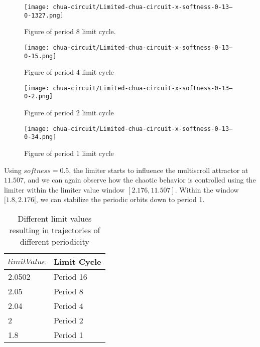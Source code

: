 \documentclass[main]{subfiles}
\begin{document}
\begin{figure}[H]
\centering
\texttt{[image: chua-circuit/Limited-chua-circuit-x-softness-0-13--0-1327.png]}
\caption[Figure of period 8 limit cycle]{Figure of period 8 limit cycle.}
\label{figure:x-0.13-8-limit-cycle-upperscroll-trajectory}
\end{figure}

\begin{figure}[H]
\centering
\texttt{[image: chua-circuit/Limited-chua-circuit-x-softness-0-13--0-15.png]}
\caption[Figure of period 4 limit cycle]{Figure of period 4 limit cycle}
\label{figure:x-0.13-4-limit-cycle-upperscroll-trajectory}
\end{figure}

\begin{figure}[H]
\centering
\texttt{[image: chua-circuit/Limited-chua-circuit-x-softness-0-13--0-2.png]}
\caption[Figure of period 3 limit cycle]{Figure of period 2 limit cycle}
\label{figure:x-0.13-2-limit-cycle-upperscroll-trajectory}
\end{figure}

\begin{figure}[H]
\centering
\texttt{[image: chua-circuit/Limited-chua-circuit-x-softness-0-13--0-34.png]}
\caption[Figure of period 1 limit cycle]{Figure of period 1 limit cycle}
\label{figure:x-0.13-1-limit-cycle-upperscroll-trajectory}
\end{figure}

Using \(softness=0.5\), the limiter starts to influence the multiscroll attractor at \(11.507\), and we can again observe how the chaotic behavior is controlled using the limiter within the limiter value window \([2.176,11.507]\). %
%
Within the window \([1.8,2.176[\), we can stabilize the periodic orbits down to period 1.

\begin{table}[H]
\renewcommand{\arraystretch}{1.2}
\center
\begin{tabular}{@{}ll@{}}
	\toprule
   \(limitValue\) & Limit Cycle\\
   \midrule
   2.0502 & Period 16 \\
   2.05 & Period 8 \\ 
   2.04 & Period 4 \\
   2  & Period 2 \\
   1.8 & Period 1 \\
   \bottomrule
\end{tabular}
\caption{Different limit values resulting in trajectories of different periodicity}
\label{table:x-0.5-lowermost-periodicities}
\end{table}
\end{document}

